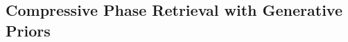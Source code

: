 \documentclass[11pt]{article}
\theoremstyle{remark}
\begin{document}

\subsection{Compressive Phase Retrieval with Generative Priors} \label{intro_of_prob_section_w_detcond}
\end{document}

